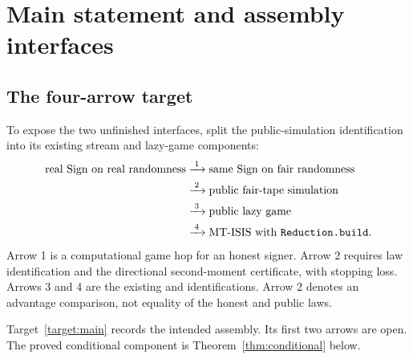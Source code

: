 \section{Main statement and assembly interfaces}\label{sec:main}
\subsection{The four-arrow target}
To expose the two unfinished interfaces, split the public-simulation
identification into its existing stream and lazy-game components:
\begin{align*}
 \text{real Sign on real randomness}
   &\xrightarrow{\;1\;}\text{same Sign on fair randomness}\\
   &\xrightarrow{\;2\;}\text{public fair-tape simulation}\\
   &\xrightarrow{\;3\;}\text{public lazy game}\\
   &\xrightarrow{\;4\;}\text{MT-ISIS with }\code{Reduction.build}.
\end{align*}
Arrow 1 is a computational game hop for an honest signer. Arrow 2
requires law identification and the directional second-moment
certificate, with stopping loss. Arrows 3 and 4 are the existing
 and 
identifications. Arrow 2 denotes an advantage comparison, not equality
of the honest and public laws.


Target~\ref{target:main} records the intended assembly. Its first two
arrows are open. The proved conditional component is
Theorem~\ref{thm:conditional} below.


